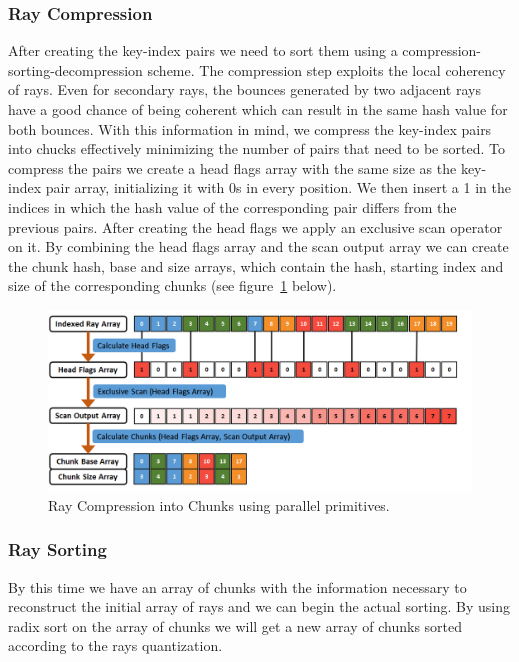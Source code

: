 \documentclass{llncs}
\begin{document}
%
\subsubsection{Ray Compression}
%

After creating the key-index pairs we need to sort them using a compression-sorting-decompression scheme. The compression step exploits the local coherency of rays. Even for secondary rays, the bounces generated by two adjacent rays have a good chance of being coherent which can result  in the same hash value for both bounces. With this information in mind, we compress the key-index pairs into chucks effectively minimizing the number of pairs that need to be sorted. To compress the pairs we create a head flags array with the same size as the key-index pair array, initializing it with 0s in every position. We then insert a 1 in the indices in which the hash value of the corresponding pair differs from the previous pairs. After creating the head flags we apply an exclusive scan operator on it. By combining the head flags array and the scan output array we can create the chunk hash, base and size arrays, which contain the hash, starting index and size of the corresponding chunks (see figure~\ref{fig:ray-compression} below).

\begin{figure}
\centering
\includegraphics[scale=0.45]{images/figure 10.png}
\caption{Ray Compression into Chunks using parallel primitives.}
\label{fig:ray-compression}
\end{figure}

\vspace*{-30pt}

%
\subsubsection{Ray Sorting}
%

By this time we have an array of chunks with the information necessary to reconstruct the initial array of rays and we can begin the actual sorting. By using radix sort \cite{Satish09} on the array of chunks we will get a new array of chunks sorted according to the rays quantization.
\end{document}
